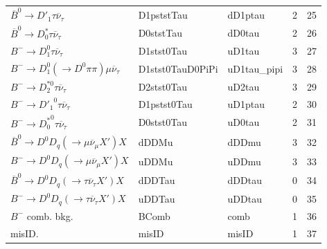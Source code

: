\begin{table}[htb]
\begin{tabular}{lllrr}
 $\overline{B}^0 \rightarrow D'_1 \tau \overline{\nu}_\tau$                           & D1pststTau               & dD1ptau           &            2 &      25 \\
 $\overline{B}^0 \rightarrow D^*_0 \tau \overline{\nu}_\tau$                          & D0ststTau                & dD0tau            &            2 &      26 \\
 $B^- \rightarrow D_1^0 \tau \overline{\nu}_\tau$                                     & D1stst0Tau               & uD1tau            &            3 &      27 \\
 $B^- \rightarrow D_1^0 (\rightarrow D^0 \pi\pi) \mu \overline{\nu}_\tau$             & D1stst0TauD0PiPi         & uD1tau\_pipi      &            3 &      28 \\
 $B^- \rightarrow D_2^{*0} \tau \overline{\nu}_\tau$                                  & D2stst0Tau               & uD2tau            &            3 &      29 \\
 $B^- \rightarrow {D'_1}^0 \tau \overline{\nu}_\tau$                                  & D1pstst0Tau              & uD1ptau           &            2 &      30 \\
 $B^- \rightarrow {D^*_0}^0 \tau \overline{\nu}_\tau$                                 & D0stst0Tau               & uD0tau            &            2 &      31 \\
 $\overline{B}^0 \rightarrow D^0 D_q (\rightarrow \mu \overline{\nu}_\mu X') X$       & dDDMu                    & dDDmu             &            3 &      32 \\
 $B^- \rightarrow D^0 D_q (\rightarrow \mu \overline{\nu}_\mu X') X$                  & uDDMu                    & uDDmu             &            3 &      33 \\
 $\overline{B}^0 \rightarrow D^0 D_q (\rightarrow \tau \overline{\nu}_\tau X') X$     & dDDTau                   & dDDtau            &            0 &      34 \\
 $B^- \rightarrow D^0 D_q (\rightarrow \tau \overline{\nu}_\tau X') X$                & uDDTau                   & uDDtau            &            0 &      35 \\
 $B^-$ comb. bkg.                                                                     & BComb                    & comb              &            1 &      36 \\
 misID.                                                                               & misID                    & misID             &            1 &      37 \\
\bottomrule
\end{tabular}
\end{table}

